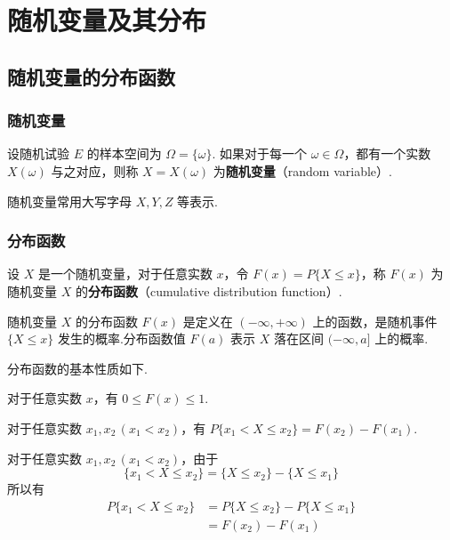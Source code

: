 \chapter{随机变量及其分布}

\section{随机变量的分布函数}

\subsection{随机变量}

\begin{definition}
    设随机试验 $E$ 的样本空间为 $\varOmega=\{\omega\}$. 如果对于每一个 $\omega\in\varOmega$，都有一个实数 $X(\omega)$ 与之对应，则称 $X=X(\omega)$ 为\textbf{随机变量}（random variable）.
\end{definition}

随机变量常用大写字母 $X,Y,Z$ 等表示.

\subsection{分布函数}

\begin{definition}
    设 $X$ 是一个随机变量，对于任意实数 $x$，令 $F(x)=P\{X \leqslant x\}$，称 $F(x)$ 为随机变量 $X$ 的\textbf{分布函数}（cumulative distribution function）.
\end{definition}

随机变量 $X$ 的分布函数 $F(x)$ 是定义在 $(-\infty,+\infty)$ 上的函数，是随机事件 $\{X \leqslant x\}$ 发生的概率.分布函数值 $F(a)$ 表示 $X$ 落在区间 $(-\infty,a]$ 上的概率.

分布函数的基本性质如下.

\setcounter{propertyname}{0}

\begin{property}
    对于任意实数 $x$，有 $0 \leqslant F(x) \leqslant 1$.
\end{property}

\begin{property}
    对于任意实数 $x_1,x_2\, (x_1<x_2)$，有 $P\{x_1 < X \leqslant x_2\}=F(x_2)-F(x_1)$.
\end{property}

\begin{myproof}
    对于任意实数 $x_1,x_2\, (x_1<x_2)$，由于
    $$
    \{x_1 < X \leqslant x_2\} = \{X \leqslant x_2\} - \{X \leqslant x_1\}
    $$
    所以有
    $$
    \begin{aligned}
        P\{x_1 < X \leqslant x_2\} &= P\{X \leqslant x_2\} - P\{X \leqslant x_1\}\\
        &= F(x_2)-F(x_1)
    \end{aligned}
    $$
\end{myproof}


